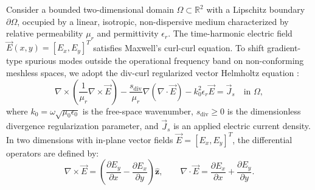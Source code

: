\documentclass[preprint,12pt]{elsarticle}
\begin{document}
Consider a bounded two-dimensional domain $\Omega \subset \mathbb{R}^2$ with a Lipschitz boundary $\partial\Omega$, occupied by a linear, isotropic, non-dispersive medium characterized by relative permeability $\mu_r$ and permittivity $\epsilon_r$. The time-harmonic electric field $\vec{E}(x, y) = [E_x, E_y]^T$ satisfies Maxwell's curl-curl equation. To shift gradient-type spurious modes outside the operational frequency band on non-conforming meshless spaces, we adopt the div-curl regularized vector Helmholtz equation \cite{stable_vnmm2d_2026}:
\begin{equation}
    \nabla \times \left(\frac{1}{\mu_r} \nabla \times \vec{E}\right) - \frac{s_{\mathrm{div}}}{\mu_r} \nabla(\nabla \cdot \vec{E}) - k_0^2 \epsilon_r \vec{E} = \vec{J}_s \quad \text{in } \Omega,
    \label{eq:helmholtz_pde}
\end{equation}
where $k_0 = \omega\sqrt{\mu_0\epsilon_0}$ is the free-space wavenumber, $s_{\mathrm{div}} \ge 0$ is the dimensionless divergence regularization parameter, and $\vec{J}_s$ is an applied electric current density. In two dimensions with in-plane vector fields $\vec{E} = [E_x, E_y]^T$, the differential operators are defined by:
\begin{equation}
    \nabla \times \vec{E} = \left(\frac{\partial E_y}{\partial x} - \frac{\partial E_x}{\partial y}\right) \hat{\mathbf{z}}, \qquad \nabla \cdot \vec{E} = \frac{\partial E_x}{\partial x} + \frac{\partial E_y}{\partial y}.
\end{equation}
\end{document}
